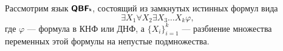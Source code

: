 
Рассмотрим язык $ {\textmd{\textbf{\textsf{QBF{\tiny k}}}}} $, состоящий из замкнутых истинных формул вида
 \[
\exists X_1 \forall X_2 \exists X_3 \ldots X_k \varphi 
,\] 
где $ \varphi $ --- формула в КНФ или ДНФ, а  $ \{X_i\}^{k}_{i=1}$ --- разбиение множества переменных этой формулы на непустые подмножества.

